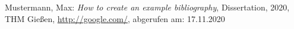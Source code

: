 
\begin{thebibliography}{99}

	Mustermann, Max:
	\emph{How to create an example bibliography},
	Dissertation,
	2020,
	THM Gießen,
	\url{http://google.com/},
	abgerufen am: 17.11.2020

\end{thebibliography}

